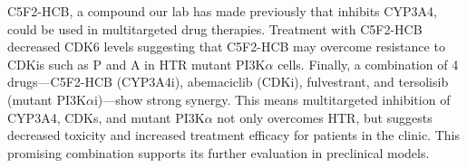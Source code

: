 { %
C5F2-HCB, a compound our lab has made previously that inhibits CYP3A4, could be used in multitargeted drug therapies. Treatment with C5F2-HCB decreased CDK6 levels suggesting that C5F2-HCB may overcome resistance to CDKis such as P and A in HTR mutant PI3K\ensuremath{\alpha} cells. Finally, a combination of 4 drugs---C5F2-HCB (CYP3A4i), abemaciclib (CDKi), fulvestrant, and tersolisib (mutant PI3K\ensuremath{\alpha}i)---show strong synergy. This means multitargeted inhibition of CYP3A4, CDKs, and mutant PI3K\ensuremath{\alpha} not only overcomes HTR, but suggests decreased toxicity and increased treatment efficacy for patients in the clinic. This promising combination supports its further evaluation in preclinical models.
}
 \newpage